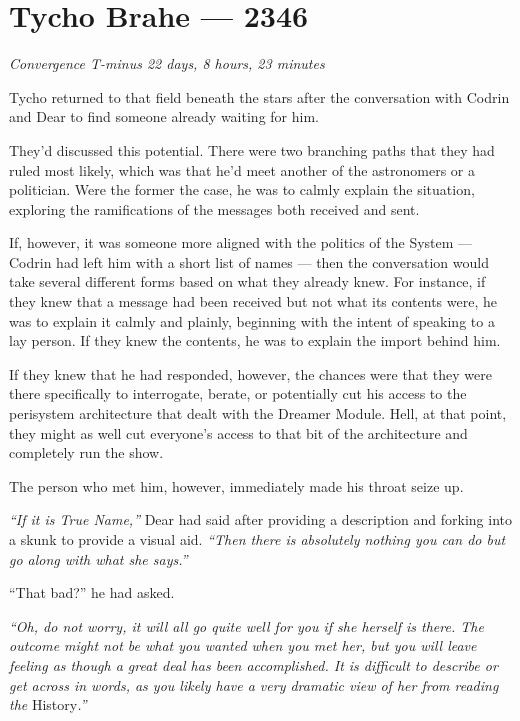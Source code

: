 \hypertarget{tycho-brahe-2346}{%
\chapter{Tycho Brahe — 2346}\label{tycho-brahe-2346}}

\begin{center}
\emph{Convergence T-minus 22 days, 8 hours, 23 minutes}
\end{center}

\noindent Tycho returned to that field beneath the stars after the conversation with Codrin and Dear to find someone already waiting for him.

They'd discussed this potential. There were two branching paths that they had ruled most likely, which was that he'd meet another of the astronomers or a politician. Were the former the case, he was to calmly explain the situation, exploring the ramifications of the messages both received and sent.

If, however, it was someone more aligned with the politics of the System — Codrin had left him with a short list of names — then the conversation would take several different forms based on what they already knew. For instance, if they knew that a message had been received but not what its contents were, he was to explain it calmly and plainly, beginning with the intent of speaking to a lay person. If they knew the contents, he was to explain the import behind him.

If they knew that he had responded, however, the chances were that they were there specifically to interrogate, berate, or potentially cut his access to the perisystem architecture that dealt with the Dreamer Module. Hell, at that point, they might as well cut everyone's access to that bit of the architecture and completely run the show.

The person who met him, however, immediately made his throat seize up.

\emph{``If it is True Name,''} Dear had said after providing a description and forking into a skunk to provide a visual aid. \emph{``Then there is absolutely nothing you can do but go along with what she says.''}

``That bad?'' he had asked.

\emph{``Oh, do not worry, it will all go quite well for you if she herself is there. The outcome might not be what you wanted when you met her, but you will leave feeling as though a great deal has been accomplished. It is difficult to describe or get across in words, as you likely have a very dramatic view of her from reading the} History\emph{.''}

